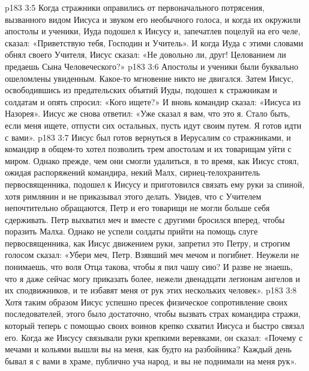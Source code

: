 \vs p183 3:5 Когда стражники оправились от первоначального потрясения, вызванного видом Иисуса и звуком его необычного голоса, и когда их окружили апостолы и ученики, Иуда подошел к Иисусу и, запечатлев поцелуй на его челе, сказал: «Приветствую тебя, Господин и Учитель». И когда Иуда с этими словами обнял своего Учителя, Иисус сказал: «Не довольно ли, друг! Целованием ли предаешь Сына Человеческого?»
\vs p183 3:6 Апостолы и ученики были буквально ошеломлены увиденным. Какое\hyp{}то мгновение никто не двигался. Затем Иисус, освободившись из предательских объятий Иуды, подошел к стражникам и солдатам и опять спросил: «Кого ищете?» И вновь командир сказал: «Иисуса из Назорея». Иисус же снова ответил: «Уже сказал я вам, что это я. Стало быть, если меня ищете, отпусти сих остальных, пусть идут своим путем. Я готов идти с вами».
\vs p183 3:7 Иисус был готов вернуться в Иерусалим со стражниками, и командир в общем\hyp{}то хотел позволить трем апостолам и их товарищам уйти с миром. Однако прежде, чем они смогли удалиться, в то время, как Иисус стоял, ожидая распоряжений командира, некий Малх, сириец\hyp{}телохранитель первосвященника, подошел к Иисусу и приготовился связать ему руки за спиной, хотя римлянин и не приказывал этого делать. Увидев, что с Учителем непочтительно обращаются, Петр и его товарищи не могли больше себя сдерживать. Петр выхватил меч и вместе с другими бросился вперед, чтобы поразить Малха. Однако не успели солдаты прийти на помощь слуге первосвященника, как Иисус движением руки, запретил это Петру, и строгим голосом сказал: «Убери меч, Петр. Взявший меч мечом и погибнет. Неужели не понимаешь, что воля Отца такова, чтобы я пил чашу сию? И разве не знаешь, что я даже сейчас могу приказать более, нежели двенадцати легионам ангелов и их сподвижников, и те избавят меня от рук этих нескольких человек».
\vs p183 3:8 Хотя таким образом Иисус успешно пресек физическое сопротивление своих последователей, этого было достаточно, чтобы вызвать страх командира стражи, который теперь с помощью своих воинов крепко схватил Иисуса и быстро связал его. Когда же Иисусу связывали руки крепкими веревками, он сказал: «Почему с мечами и кольями вышли вы на меня, как будто на разбойника? Каждый день бывал я с вами в храме, публично уча народ, и вы не поднимали на меня рук».
